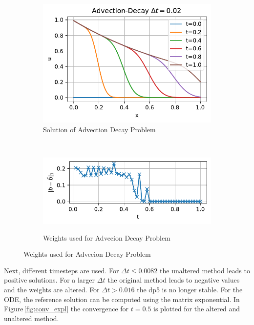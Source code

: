 \documentclass[a4paper]{article}
\numberwithin{equation}{section}
\theoremstyle{plain}
\theoremstyle{definition}
\numberwithin{theorem}{section}
\newcommand{\dt}{{\Delta t}}
\newcommand{\1}{\mathbbm{1}}
\begin{document}
\begin{figure}
\centering
\begin{subfigure}[b]{0.45\textwidth}
\includegraphics[width=1\textwidth]{plots/Advection_Decay.pdf}
\caption{Solution of Advection Decay Problem}
\label{fig:sol_AdDe}
\end{subfigure}
\\
\begin{subfigure}[b]{0.45\textwidth}
\includegraphics[width=1\textwidth]{plots/b_Advection_Decay.pdf}\\
\caption{Weights used for Advecion Decay Problem}
\label{fig:weights_AdDe}
\end{subfigure}
\end{figure}


Next, different timesteps are used.
For $\dt \leq 0.0082$ the unaltered method leads to positive solutions. For a larger $\dt$ the original method leads to negative values and the weights are altered. For $\dt >0.016$ the dp5 is no longer stable.
For the ODE, the reference solution can be computed using the matrix exponential. 
In Figure\,\ref{fig:conv_expl} the convergence for $t=0.5$ is plotted for the altered and unaltered method.
\end{document}
